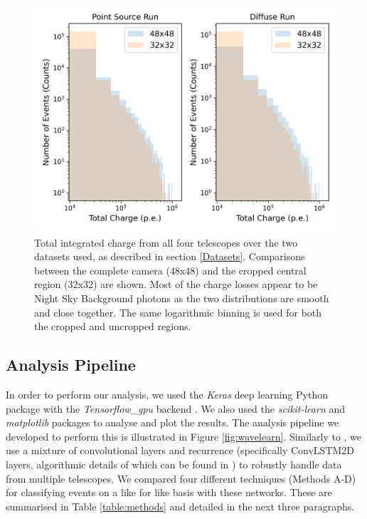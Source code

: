 \begin{figure}
  \centering
  \includegraphics[width=0.7
  \textwidth]{figures/chargehistlog.png}
  \caption{Total integrated charge from all four telescopes over the two datasets used, as described in section \ref{Datasets}. Comparisons between the complete camera (48x48) and the cropped central region (32x32) are shown.  Most of the charge losses appear to be Night Sky Background photons as the two distributions are smooth and close together. The same logarithmic binning is used for both the cropped and uncropped regions.}
  \label{fig:chargehist}
\end{figure}

\subsection{Analysis Pipeline}
In order to perform our analysis, we used the \textit{Keras}  \cite{Keras} deep learning Python package with the \textit{Tensorflow\_gpu} backend \cite{tensorflow}. We also used the \textit{scikit-learn} \cite{scikit} and \textit{matplotlib}  \cite{matplotlib} packages to analyse and plot the results. The analysis pipeline we developed to perform this is illustrated in Figure \ref{fig:wavelearn}. Similarly to \cite{Shilon}, we use a mixture of convolutional layers and recurrence (specifically ConvLSTM2D layers, algorithmic details of which can be found in \cite{shi}) to robustly handle data from multiple telescopes. We compared four different techniques (Methods A-D) for classifying events on a like for like basis with these networks. These are summarised in Table \ref{table:methods} and detailed in the next three paragraphs. 

